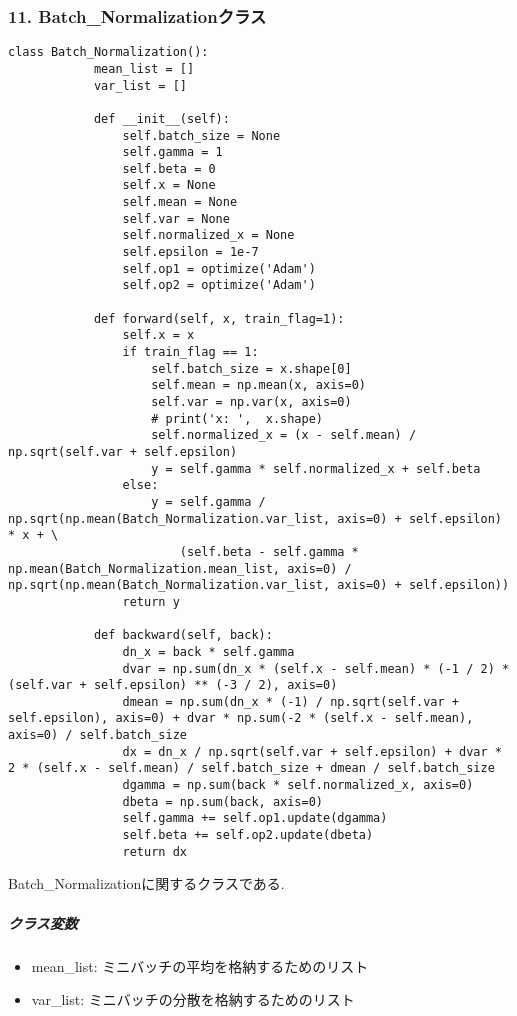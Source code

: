 \documentclass[a4j, titlepage]{jarticle}
\begin{document}
    \subsubsection*{11. Batch\_Normalizationクラス}
        \begin{lstlisting}[caption=Batch\_Normalizationに関する計算 ,label=fuga]
        class Batch_Normalization():
            mean_list = []
            var_list = []

            def __init__(self):
                self.batch_size = None
                self.gamma = 1
                self.beta = 0
                self.x = None
                self.mean = None
                self.var = None
                self.normalized_x = None
                self.epsilon = 1e-7
                self.op1 = optimize('Adam')
                self.op2 = optimize('Adam')

            def forward(self, x, train_flag=1):
                self.x = x
                if train_flag == 1:
                    self.batch_size = x.shape[0]
                    self.mean = np.mean(x, axis=0)
                    self.var = np.var(x, axis=0)
                    # print('x: ',  x.shape)
                    self.normalized_x = (x - self.mean) / np.sqrt(self.var + self.epsilon)
                    y = self.gamma * self.normalized_x + self.beta
                else:
                    y = self.gamma / np.sqrt(np.mean(Batch_Normalization.var_list, axis=0) + self.epsilon) * x + \
                        (self.beta - self.gamma * np.mean(Batch_Normalization.mean_list, axis=0) / np.sqrt(np.mean(Batch_Normalization.var_list, axis=0) + self.epsilon))
                return y

            def backward(self, back):
                dn_x = back * self.gamma
                dvar = np.sum(dn_x * (self.x - self.mean) * (-1 / 2) * (self.var + self.epsilon) ** (-3 / 2), axis=0)
                dmean = np.sum(dn_x * (-1) / np.sqrt(self.var + self.epsilon), axis=0) + dvar * np.sum(-2 * (self.x - self.mean), axis=0) / self.batch_size
                dx = dn_x / np.sqrt(self.var + self.epsilon) + dvar * 2 * (self.x - self.mean) / self.batch_size + dmean / self.batch_size
                dgamma = np.sum(back * self.normalized_x, axis=0)
                dbeta = np.sum(back, axis=0)
                self.gamma += self.op1.update(dgamma)
                self.beta += self.op2.update(dbeta)
                return dx
        \end{lstlisting}
        Batch\_Normalizationに関するクラスである.
            \subparagraph*{クラス変数}
            \begin{itemize}
                \item mean\_list: ミニバッチの平均を格納するためのリスト
                \item var\_list: ミニバッチの分散を格納するためのリスト
            \end{itemize}
\end{document}
